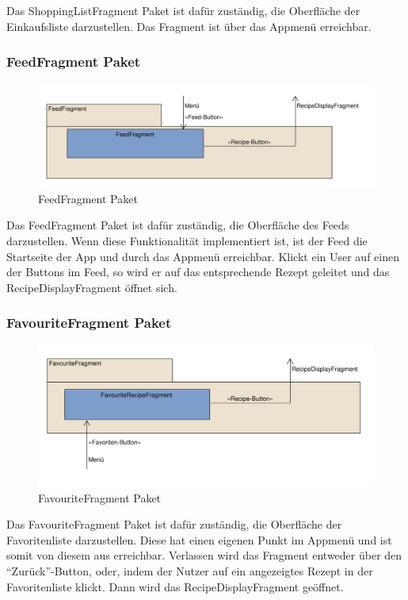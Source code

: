 Das ShoppingListFragment Paket ist dafür zuständig, die Oberfläche
der Einkaufsliste darzustellen. Das Fragment ist über das Appmenü erreichbar.


\subsubsection{FeedFragment Paket}
\begin{figure}[H]
	\centering
	\includegraphics[width=\textwidth]{pics/viewPackages/FeedFragmentPaket.pdf}%
	\caption{FeedFragment Paket}%
	\label{view}%
\end{figure}
Das FeedFragment Paket ist dafür zuständig, die Oberfläche
des Feeds darzustellen. Wenn diese Funktionalität implementiert ist, ist der Feed die Startseite der App und durch das Appmenü erreichbar. Klickt ein User auf einen der Buttons im Feed, so wird er auf das entsprechende Rezept geleitet und das RecipeDisplayFragment öffnet sich.

\subsubsection{FavouriteFragment Paket}
\begin{figure}[H]
	\centering
	\includegraphics[width=\textwidth]{pics/viewPackages/FavouriteFragmentPaket.pdf}%
	\caption{FavouriteFragment Paket}%
	\label{view}%
\end{figure}

Das FavouriteFragment Paket ist dafür zuständig, die Oberfläche
der Favoritenliste darzustellen.
Diese hat einen eigenen Punkt im Appmenü und ist somit von diesem aus erreichbar. Verlassen wird das Fragment entweder über den "`Zurück"'-Button, oder, indem der Nutzer auf ein angezeigtes Rezept in der Favoritenliste klickt. Dann wird das RecipeDisplayFragment geöffnet.

